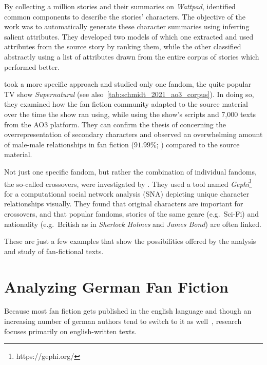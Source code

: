 By collecting a million stories and their summaries on \emph{Wattpad}, \citet{Zhang2019GeneratingFiction} identified common components to describe the stories' characters.
The objective of the work was to automatically generate these character summaries using inferring salient attributes.
They developed two models of which one extracted and used attributes from the source story by ranking them, while the other classified abstractly using a list of attributes drawn from the entire corpus of stories which performed better.

\citet{Kleindienst2020InvestigatingSupernatural} took a more specific approach and studied only one fandom, the quite popular TV show \emph{Supernatural} (see also~\ref{tab:schmidt_2021_ao3_corpus}).
In doing so, they examined how the fan fiction community adapted to the source material over the time the show ran using, while using the show's scripts and 7,000 texts from the AO3 platform.
They can confirm the thesis of \citet{Milli2016BeyondFanfiction} concerning the overrepresentation of secondary characters and observed an overwhelming amount of male-male relationships in fan fiction ($91.99\%$; \citet{Tosenberger2008HomosexualityFanfiction, HelleksonBusse2006, Duggan2017RevisingFanfiction}) compared to the source material.

Not just one specific fandom, but rather the combination of individual fandoms, the so-called crossovers, were investigated by \citet{Schmidt2022AnalyzingOwn}.
They used a tool named \emph{Gephi}\footnote{https://gephi.org/} for a computational social network analysis (SNA) depicting unique character relationships visually.
They found that original characters are important for crossovers, and that popular fandoms, stories of the same genre (e.g.\ Sci-Fi) and nationality (e.g.\ British as in \emph{Sherlock Holmes} and \emph{James Bond}) are often linked.

These are just a few examples that show the possibilities offered by the analysis and study of fan-fictional texts.


\section{Analyzing German Fan Fiction}\label{sec:german-fan-fiction} %

Because most fan fiction gets published in the english language and though an increasing number of german authors tend to switch to it as well~\citep{Cuntz-Leng2015AGermany}, research focuses primarily on english-written texts.

